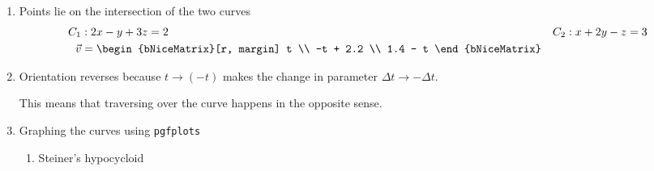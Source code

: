 \begin{enumerate}
    \item Points lie on the intersection of the two curves
          \begin{align}
              C_1     & : 2x - y + 3z = 2                &
              C_2     & : x + 2y - z = 3                   \\
              \vec{v} & = \begin{bNiceMatrix}[r, margin]
                              t \\ -t + 2.2 \\ 1.4 - t
                          \end{bNiceMatrix}
          \end{align}

    \item Orientation reverses because $ t \rightarrow (-t) $ makes the change in
          parameter $ \Delta t \rightarrow -\Delta t $. \par
          This means that traversing over the curve happens in the opposite sense.

    \item Graphing the curves using \texttt{pgfplots}
          \begin{enumerate}
              \item Steiner's hypocycloid
                    \begin{figure}[H]
                        \centering
                    \end{figure}


\end{enumerate}
\end{enumerate}
